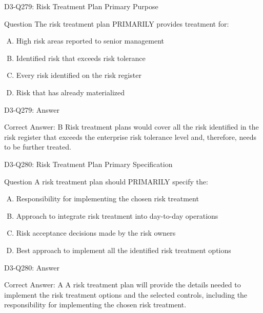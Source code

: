 \documentclass{beamer}
\begin{document}
	\begin{frame}{D3-Q279: Risk Treatment Plan Primary Purpose}
		\begin{block}{Question}
			The risk treatment plan PRIMARILY provides treatment for:
		\end{block}
		\begin{enumerate}[(A)]
			\item High risk areas reported to senior management
			\item Identified risk that exceeds risk tolerance
			\item Every risk identified on the risk register
			\item Risk that has already materialized
		\end{enumerate}
	\end{frame}
	\begin{frame}{D3-Q279: Answer}
		\begin{block}{Correct Answer: B}
			Risk treatment plans would cover all the risk identified in the risk register that exceeds the enterprise risk tolerance level and, therefore, needs to be further treated.
		\end{block}
	\end{frame}
	
	\begin{frame}{D3-Q280: Risk Treatment Plan Primary Specification}
		\begin{block}{Question}
			A risk treatment plan should PRIMARILY specify the:
		\end{block}
		\begin{enumerate}[(A)]
			\item Responsibility for implementing the chosen risk treatment
			\item Approach to integrate risk treatment into day-to-day operations
			\item Risk acceptance decisions made by the risk owners
			\item Best approach to implement all the identified risk treatment options
		\end{enumerate}
	\end{frame}
	\begin{frame}{D3-Q280: Answer}
		\begin{block}{Correct Answer: A}
			A risk treatment plan will provide the details needed to implement the risk treatment options and the selected controls, including the responsibility for implementing the chosen risk treatment.
		\end{block}
	\end{frame}
	
\end{document}
